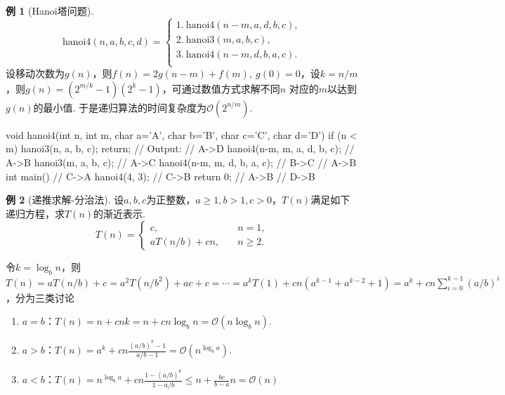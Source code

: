 \documentclass[12pt, a4paper, oneside]{ctexart}
\numberwithin{equation}{section}  %
\theoremstyle{definition}
\newtheorem{example}{例}[section]
\let\leq=\leqslant %
\let\geq=\geqslant %
\def\O{\mathcal{O}}         %
\begin{document}
\begin{example}[Hanoi塔问题]
\begin{equation*}
    \text{hanoi4}(n,a,b,c,d)=\begin{cases}
        1.\ \text{hanoi4}(n-m,a,d,b,c),\\
        2.\ \text{hanoi3}(m, a, b, c),\\
        3.\ \text{hanoi4}(n-m,d,b,a,c).\\
    \end{cases}
\end{equation*}
设移动次数为$g(n)$，则$f(n) = 2g(n-m)+f(m),\ g(0)=0$，设$k=n/m$，则$g(n) = (2^{m/k}-1)(2^k-1)$，可通过数值方式求解不同$n$
对应的$m$以达到$g(n)$的最小值. 于是递归算法的时间复杂度为$\O(2^{n/m})$.
\begin{cppcode}
void hanoi4(int n, int m, char a='A', char b='B', char c='C', char d='D') {
    if (n < m) {
        hanoi3(n, a, b, c);
        return;                             //  Output:
    }                                       //  A->D
    hanoi4(n-m, m, a, d, b, c);             //  A->B
    hanoi3(m, a, b, c);                     //  A->C
    hanoi4(n-m, m, d, b, a, c);             //  B->C
}                                           //  A->B
int main() {                                //  C->A
    hanoi4(4, 3);                           //  C->B
    return 0;                               //  A->B
}                                           //  D->B
\end{cppcode}
\end{example}
\begin{example}[递推求解-分治法]\label{example-division}
    设$a,b,c$为正整数，$a\geq 1, b>1,c>0$，$T(n)$满足如下递归方程，求$T(n)$的渐近表示.
    \begin{equation*}
        T(n) =\begin{cases}
            c,&\quad n=1,\\
            aT(n/b)+cn,&\quad n\geq 2.
        \end{cases}
    \end{equation*}

    令$k = \log_bn$，则$T(n) = aT(n/b)+c = a^2T(n/b^2)+ac+c = \cdots = a^kT(1)+cn(a^{k-1}+a^{k-2}+1) = a^k + cn\sum_{i=0}^{k-1}(a/b)^i$，分为三类讨论
    \begin{enumerate}
        \item $a=b$：$T(n) = n+cnk = n+cn\log_bn = \O(n\log_bn)$.
        \item $a>b$：$T(n) = a^k+cn\frac{(a/b)^k-1}{a/b-1} = \O(n^{\log_ba})$.
        \item $a<b$：$T(n) = n^{\log_ba}+cn\frac{1-(a/b)^k}{1-a/b}\leq n+\frac{bc}{b-a}n = \O(n)$
    \end{enumerate}
\end{example}
\end{document}
